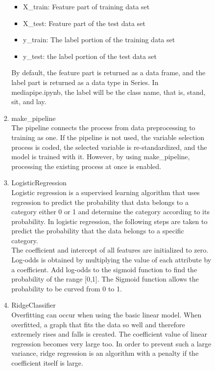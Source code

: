 \documentclass[conference]{IEEEtran}
\begin{document}
\begin{enumerate}[label=\arabic*.]
\begin{enumerate}[label=\arabic*.]
\begin{enumerate}[label=\alph*.]
\begin{enumerate}[label=\roman*.]
            \begin{itemize}
                \item X\_train: Feature part of training data set
                \item X\_test: Feature part of the test data set
                \item y\_train: The label portion of the training data set
                \item y\_test: the label portion of the test data set \\
            \end{itemize}
            By default, the feature part is returned as a data frame, and the label part is returned as a data type in Series. In mediapipe.ipynb, the label will be the class name, that is, stand, sit, and lay. \\
            \item{\large{make\_pipeline}}\\ 
            The pipeline connects the process from data preprocessing to training as one. If the pipeline is not used, the variable selection process is coded, the selected variable is re-standardized, and the model is trained with it. However, by using make\_pipeline, processing the existing process at once is enabled. \\
            \item{\large{LogisticRegression}}\\ 
            Logistic regression is a supervised learning algorithm that uses regression to predict the probability that data belongs to a category either 0 or 1 and determine the category according to its probability. In logistic regression, the following steps are taken to predict the probability that the data belongs to a specific category. \\
            The coefficient and intercept of all features are initialized to zero. Log-odds is obtained by multiplying the value of each attribute by a coefficient. Add log-odds to the sigmoid function to find the probability of the range [0,1]. The Sigmoid function allows the probability to be curved from 0 to 1. \\
            \item{\large{RidgeClassifier}}\\ 
            Overfitting can occur when using the basic linear model. When overfitted, a graph that fits the data so well and therefore extremely rises and falls is created. The coefficient value of linear regression becomes very large too. In order to prevent such a large variance, ridge regression is an algorithm with a penalty if the coefficient itself is large. \\

\end{enumerate}
\end{enumerate}
\end{enumerate}
\end{enumerate}
\end{document}

